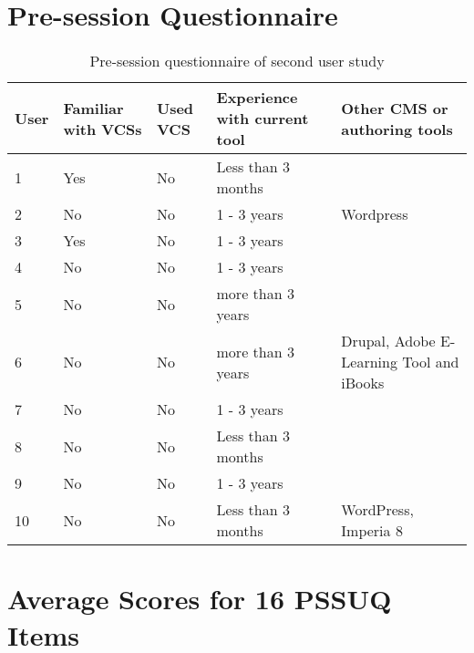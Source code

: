 
\section{Pre-session Questionnaire}

\begin{table}[h!]
\centering
\begin{tabular}{|l|p{3.5cm}|p{1.5cm}|p{3.5cm}|p{3.5cm}|}
\hline
\rowcolor[HTML]{EFEFEF}
\textbf{User} & \textbf{Familiar with VCSs} & \textbf{Used VCS} & \textbf{Experience with current tool} & \textbf{Other CMS or authoring tools} \\ \hline
1 & Yes & No & Less than 3 months &  \\ \hline
2 & No & No & 1 - 3 years & Wordpress \\ \hline
3 & Yes & No & 1 - 3 years &  \\ \hline
4 & No & No & 1 - 3 years &  \\ \hline
5 & No & No & more than 3 years &  \\ \hline
6 & No & No & more than 3 years & Drupal, Adobe E-Learning Tool and iBooks \\ \hline
7 & No & No & 1 - 3 years &  \\ \hline
8 & No & No & Less than 3 months &  \\ \hline
9 & No & No & 1 - 3 years &  \\ \hline
10 & No & No & Less than 3 months & WordPress, Imperia 8 \\ \hline
\end{tabular}
\caption{Pre-session questionnaire of second user study}
\label{table:pre-sess-quest-second}
\end{table}

\clearpage

\section{Average Scores for 16 PSSUQ Items} \label{appendix:pssuq}

